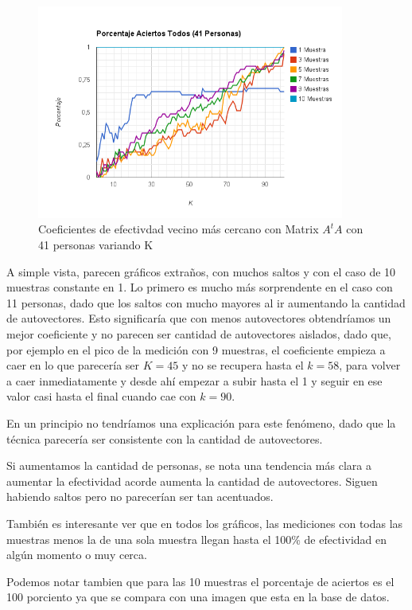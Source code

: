 \begin{figure}[H]
\includegraphics[width=0.90\textwidth]{img/image12.png}
     \caption{Coeficientes de efectivdad vecino más cercano con Matrix $A^tA$ con 41 personas variando K}
\end{figure}

A simple vista, parecen gráficos extraños, con muchos saltos y con el caso de 10 muestras constante
en 1. Lo primero es mucho más sorprendente en el caso con 11 personas, dado que los saltos con mucho
mayores al ir aumentando la cantidad de autovectores. Esto significaría que con menos autovectores
obtendríamos un mejor coeficiente y no parecen ser cantidad de autovectores aislados, dado que, por
ejemplo en el pico de la medición con 9 muestras, el coeficiente empieza a caer en lo que parecería
ser $K=45$ y no se recupera hasta el $k=58$, para volver a caer inmediatamente y desde ahí empezar a
subir hasta el 1 y seguir en ese valor casi hasta el final cuando cae con $k=90$.

En un principio no tendríamos una explicación para este fenómeno, dado que la técnica parecería ser
consistente con la cantidad de autovectores.

Si aumentamos la cantidad de personas, se nota una tendencia más clara a aumentar la efectividad
acorde aumenta la cantidad de autovectores. Siguen habiendo saltos pero no parecerían ser tan
acentuados.

También es interesante ver que en todos los gráficos, las mediciones con todas las muestras menos la
de una sola muestra llegan hasta el 100\% de efectividad en algún momento o muy cerca.

Podemos notar tambien que para las 10 muestras el porcentaje de aciertos es el 100 porciento ya que se compara con una imagen que esta en la base de datos.



